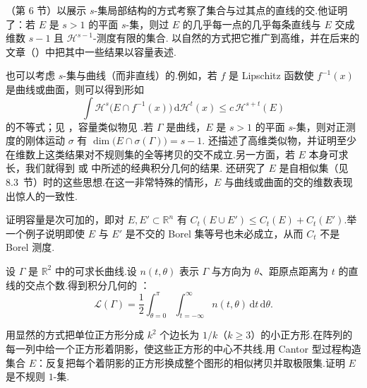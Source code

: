 \textcite{marstrand1954a}（第 6 节）以展示 $s$-集局部结构的方式考察了集合与过其点的直线的交.他证明了：若 $E$ 是 $s>1$ 的平面 $s$-集，则过 $E$ 的几乎每一点的几乎每条直线与 $E$ 交成维数 $s-1$ 且 $\mathcal{H}^{s-1}$-测度有限的集合.\textcite{mattila1975b} 以自然的方式把它推广到高维，并在后来的文章（\citeyear{mattila1981}）中把其中一些结果以容量表述.

也可以考虑 $s$-集与曲线（而非直线）的.例如，若 $f$ 是 Lipschitz 函数使 $f^{-1}(x)$ 是曲线或曲面，则可以得到形如
\[
  \int\mathcal{H}^{s}\bigl(E\cap f^{-1}(x)\bigr)\,\mathrm{d}\mathcal{H}^{t}(x)\leq c\,\mathcal{H}^{s+t}(E)
\]
的不等式；见 \textcite{federer1969}，容量类似物见 \textcites{mattila1984a,mattila1984b}.若 $\Gamma$ 是曲线，$E$ 是 $s>1$ 的平面 $s$-集，则对正测度的刚体运动 $\sigma$ 有 $\dim\bigl(E\cap\sigma(\Gamma)\bigr)=s-1$.\textcite{mattila1984a} 还描述了高维类似物，并证明至少在维数上这类结果对不规则集的全等拷贝的交不成立.另一方面，若 $E$ 本身可求长，我们就得到 \textcite{federer1969} 或 \textcite{santalo1976} 中所述的经典积分几何的结果.\textcite{mattila1982} 还研究了 $E$ 是自相似集（见 8.3~节）时的这些思想.在这一非常特殊的情形，$E$ 与曲线或曲面的交的维数表现出惊人的一致性.

\begin{exercises}
\item 证明容量是次可加的，即对 $E,E'\subset\mathbb{R}^n$ 有 $C_t(E\cup E')\leq C_t(E)+C_t(E')$.举一个例子说明即使 $E$ 与 $E'$ 是不交的 Borel 集等号也未必成立，从而 $C_t$ 不是 Borel 测度.
\item 设 $\Gamma$ 是 $\mathbb{R}^2$ 中的可求长曲线.设 $n(t,\theta)$ 表示 $\Gamma$ 与方向为 $\theta$、距原点距离为 $t$ 的直线的交点个数.得到积分几何的 ：
\[
  \mathscr{L}(\Gamma)=\frac{1}{2}\int_{\theta=0}^{\pi}\int_{t=-\infty}^{\infty}n(t,\theta)\,\mathrm{d}t\,\mathrm{d}\theta.
\]
\item 用显然的方式把单位正方形分成 $k^2$ 个边长为 $1/k$（$k\geq 3$）的小正方形.在阵列的每一列中给一个正方形着阴影，使这些正方形的中心不共线.用 Cantor 型过程构造集合 $E$：反复把每个着阴影的正方形换成整个图形的相似拷贝并取极限集.证明 $E$ 是不规则 $1$-集.
\end{exercises}

